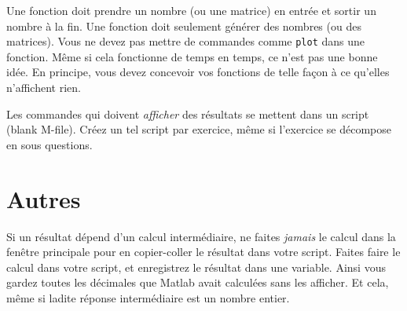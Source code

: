 Une fonction doit prendre un nombre (ou une matrice) en entrée et sortir un nombre à la fin. Une fonction doit seulement générer des nombres (ou des matrices). Vous ne devez pas mettre de commandes comme \verb+plot+ dans une fonction. Même si cela fonctionne de temps en temps, ce n'est pas une bonne idée. En principe, vous devez concevoir vos fonctions de telle façon à ce qu'elles n'affichent rien.

Les commandes qui doivent \emph{afficher} des résultats se mettent dans un script (blank M-file). Créez un tel script par exercice, même si l'exercice se décompose en sous questions.

\section{Autres}

Si un résultat dépend d'un calcul intermédiaire, ne faites \emph{jamais} le calcul dans la fenêtre principale pour en copier-coller le résultat dans votre script. Faites faire le calcul dans votre script, et enregistrez le résultat dans une variable. Ainsi vous gardez toutes les décimales que Matlab avait calculées sans les afficher. Et cela, même si ladite réponse intermédiaire est un nombre entier.


